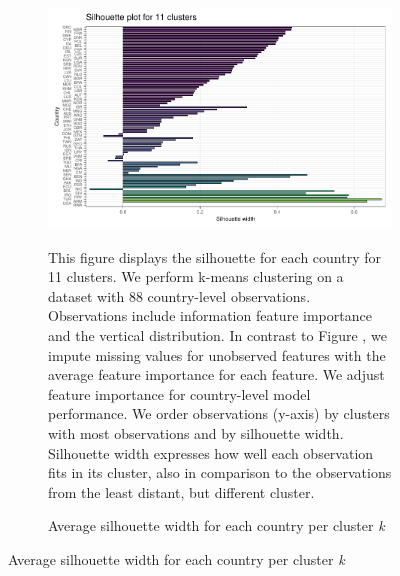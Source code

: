  \begin{figure}[ht!]\ContinuedFloat
   \centering
   \begin{subfigure}[b]{\textwidth}
   \centering
   \caption{Average silhouette width for each country per cluster \textit{k}} \label{fig:G2_silhouette_3}
   \includegraphics{Figures_Appendix/Figure_Silhouette_Clusters_3.pdf}
   \begin{subcaption2}
     This figure displays the silhouette for each country for 11 clusters. We perform k-means clustering on a dataset with 88 country-level observations. Observations include information feature importance and the vertical distribution. In contrast to Figure , we impute missing values for unobserved features with the average feature importance for each feature. We adjust feature importance for country-level model performance.  We order observations (y-axis) by clusters with most observations and by silhouette width. Silhouette width expresses how well each observation fits in its cluster, also in comparison to the observations from the least distant, but different cluster.
   \end{subcaption2}
   \end{subfigure}
 \end{figure}
 \clearpage